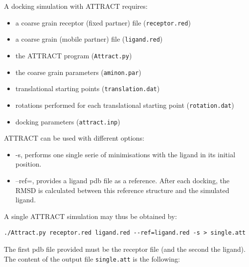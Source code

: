 \documentclass[12pt,a4paper]{article}
\begin{document}
A docking simulation with ATTRACT requires:
\begin{itemize}
\item a coarse grain receptor (fixed partner) file ({\tt receptor.red})
\item a coarse grain (mobile partner) file ({\tt ligand.red})
\item the ATTRACT program ({\tt  Attract.py})
\item the coarse grain parameters ({\tt aminon.par})
\item translational starting points ({\tt translation.dat})
\item rotations performed for each translational starting point ({\tt rotation.dat})
\item docking parameters ({\tt attract.inp})
\end{itemize}

ATTRACT can be used with different options:
\begin{itemize}
\item -s, performs one single serie of minimisations with the ligand in its initial position.
\item --ref=, provides a ligand pdb file as a reference. After each docking, the RMSD is calculated between this reference structure and the simulated ligand.
\end{itemize}

A single ATTRACT simulation may thus be obtained by:
\begin{verbatim}
./Attract.py receptor.red ligand.red --ref=ligand.red -s > single.att
\end{verbatim}

The first pdb file provided must be the receptor file (and the second the ligand).
The content of the output file {\tt single.att} is the following:
\end{document}

